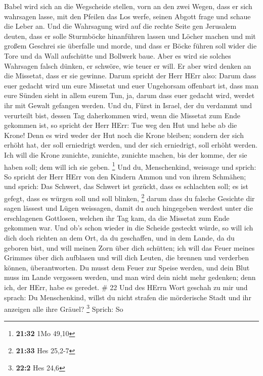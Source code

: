 Babel wird sich an die Wegscheide stellen, vorn an den zwei Wegen, dass
er sich wahrsagen lasse, mit den Pfeilen das Los werfe, seinen Abgott
frage und schaue die Leber an.  Und die Wahrsagung wird auf
die rechte Seite gen Jerusalem deuten, dass er solle Sturmböcke
hinanführen lassen und Löcher machen und mit großem Geschrei sie
überfalle und morde, und dass er Böcke führen soll wider die Tore und da
Wall aufschütte und Bollwerk baue.  Aber es wird sie
solches Wahrsagen falsch dünken, er schwöre, wie teuer er will. Er aber
wird denken an die Missetat, dass er sie gewinne.  Darum
spricht der Herr HErr also: Darum dass euer gedacht wird um eure
Missetat und euer Ungehorsam offenbart ist, dass man eure Sünden sieht
in allem eurem Tun, ja, darum dass euer gedacht wird, werdet ihr mit
Gewalt gefangen werden.  Und du, Fürst in Israel, der du
verdammt und verurteilt bist, dessen Tag daherkommen wird, wenn die
Missetat zum Ende gekommen ist,  so spricht der Herr HErr:
Tue weg den Hut und hebe ab die Krone! Denn es wird weder der Hut noch
die Krone bleiben; sondern der sich erhöht hat, der soll erniedrigt
werden, und der sich erniedrigt, soll erhöht werden.  Ich
will die Krone zunichte, zunichte, zunichte machen, bis der komme, der
sie haben soll; dem will ich sie geben. \footnote{\textbf{21:32} 1Mo
  49,10}  Und du, Menschenkind, weissage und sprich: So
spricht der Herr HErr von den Kindern Ammon und von ihrem Schmähen; und
sprich: Das Schwert, das Schwert ist gezückt, dass es schlachten soll;
es ist gefegt, dass es würgen soll und soll blinken, \footnote{\textbf{21:33}
  Hes 25,2-7}  darum dass du falsche Gesichte dir sagen
lässest und Lügen weissagen, damit du auch hingegeben werdest unter die
erschlagenen Gottlosen, welchen ihr Tag kam, da die Missetat zum Ende
gekommen war.  Und ob's schon wieder in die Scheide
gesteckt würde, so will ich dich doch richten an dem Ort, da du
geschaffen, und in dem Lande, da du geboren bist,  und will
meinen Zorn über dich schütten; ich will das Feuer meines Grimmes über
dich aufblasen und will dich Leuten, die brennen und verderben können,
überantworten.  Du musst dem Feuer zur Speise werden, und
dein Blut muss im Lande vergossen werden, und man wird dein nicht mehr
gedenken; denn ich, der HErr, habe es geredet. \# 22  Und
des HErrn Wort geschah zu mir und sprach:  Du Menschenkind,
willst du nicht strafen die mörderische Stadt und ihr anzeigen alle ihre
Gräuel? \footnote{\textbf{22:2} Hes 24,6}  Sprich: So
